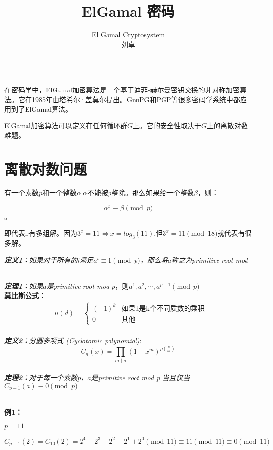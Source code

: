 \documentclass{article}
\date{}
\title{ElGamal 密码}
\author{
El Gamal Cryptosystem\\
 刘卓\\
 \texttt{ } \\
}
\begin{document}
\maketitle

在密码学中，ElGamal加密算法是一个基于迪菲-赫尔曼密钥交换的非对称加密算法。它在1985年由塔希尔·盖莫尔提出。GnuPG和PGP等很多密码学系统中都应用到了ElGamal算法。

ElGamal加密算法可以定义在任何循环群$G$上。它的安全性取决于$G$上的离散对数难题。

\section{离散对数问题}
有一个素数$p$和一个整数$\alpha$,$\alpha$不能被$p$整除。那么如果给一个整数$\beta$，则：

$$\alpha^x \equiv \beta \pmod{p}$$。

即代表$x$有多组解。因为$3^x = 11 \Leftrightarrow	 x = log_3(11)$,但$3^x = 11 \pmod{18}$就代表有很多解。

\textit{\textbf{定义1：}如果对于所有的$i$满足$a^i \equiv 1\pmod{p}$，那么将$a$称之为{\color{red}primitive root mod}}

~\\

\textit{\textbf{定理1：}如果$a$是{\color{red}primitive root mod p}}，则$a^1,a^2,\cdots ,a^{p-1} \pmod{p}$
~\\

\textbf{莫比斯公式：}
$$
\begin{aligned}
&\mu(d)=\left\{\begin{array}{ll}
(-1)^{k} & \mbox{如果d是k个不同质数的乘积} \\
0 & \mbox{其他} 
\end{array}\right.\\
\end{aligned}
$$

\textit{\textbf{定义2：}分圆多项式 (Cyclotomic polynomial)}:
$$
C_{n}(x)=\prod_{m \mid n}\left(1-x^{m}\right)^{\mu\left(\frac{n}{m}\right)}
$$
~\\



\textit{\textbf{定理2：}对于每一个素数$p$，$a$是{\color{red}primitive root mod p} 当且仅当$C_{p-1}(a) \equiv 0 \pmod{p}$ }

~\\

\textbf{例1：}

$p = 11$

$$C_{p-1}(2) = C_{10}(2) = 2^4- 2^3 +2^2-2^1+2^0 \pmod{11} \equiv 11 \pmod{11} \equiv 0 \pmod{11}$$
\end{document}
